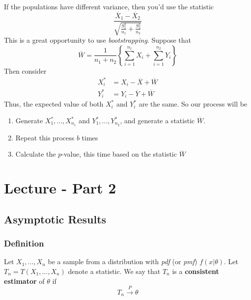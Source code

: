 \documentclass{article}
\begin{document}
If the populations have different variance, then you'd use the statistic
\begin{equation*}
    \frac{\overline{X}_1 - \overline{X}_2}{\sqrt{\frac{S_1^2}{n_1} + \frac{S_2^2}{n_2}}}
\end{equation*}
This is a great opportunity to use \textit{bootstrapping}. Suppose that
\begin{equation*}
    \overline{W} = \frac{1}{n_1 + n_2} \left\{\sum_{i=1}^{n_1} X_i + \sum_{i=1}^{n_2} Y_i \right\}
\end{equation*}
Then consider
\begin{equation*}
    \begin{split}
        X_i^* &= X_i - \overline{X} + \overline{W}\\
        Y_i^* &= Y_i - \overline{Y} + \overline{W}
    \end{split}
\end{equation*}
Thus, the expected value of both $X_i^*$ and $Y_i^*$ are the same. So our process will be
\begin{enumerate}
    \item Generate $X_1^*,...,X_{n_1}^*$ and $Y_1^*,...,Y_{n_2}^*$, and generate a statistic $\overline{W}$.
    \item Repeat this process $b$ times
    \item Calculate the $p$-value, this time based on the statistic $\overline{W}$
\end{enumerate}

\section{Lecture - Part 2}

\subsection{Asymptotic Results}

\subsubsection{Definition}
Let $X_1,...,X_n$ be a sample from a distribution with \textit{pdf} (or \textit{pmf}) $f(x|\theta)$. Let $T_n = T(X_1,...,X_n)$ denote a statistic. We say that $T_n$ is a \textbf{consistent estimator} of $\theta$ if 
\begin{equation*}
    T_n \xrightarrow{P} \theta
\end{equation*}
\end{document}
